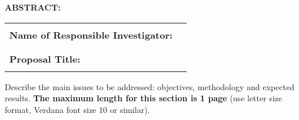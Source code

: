 \documentclass[10pt]{article}
\begin{document}
\noindent \textbf{ABSTRACT: }

\noindent \textbf{}

\begin{tabular}{|p{2.3in}|p{4.7in}|}
\hline
\parbox{2.3in}{\centering }
& \parbox{4.7in} {\centering }  \\

\parbox{2.3in} {\raggedright \textbf{Name of Responsible Investigator:} }
& \parbox{4.7in} {\centering}\\

\parbox{2.3in}{\centering } 
& \parbox{4.7in} {\centering }  \\
\hline 
\parbox{2.3in}{\centering }
& \parbox{4.7in} {\centering }  \\
\parbox{2.3in} {\raggedright\textbf{Proposal Title:} }
& \parbox{4.7in} {\centering}\\
\parbox{2.3in}{\centering }
& \parbox{4.7in} {\centering }  \\
\hline 
\end{tabular}

\vspace{15pt}
\noindent Describe the main issues to be addressed: objectives,
methodology and expected results. {\bf The maximum length for this section
is 1 page} (use letter size format, Verdana font size 10 or similar).
\\
\\
\end{document}

